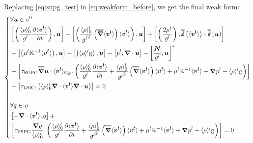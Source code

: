 Replacing \cref{eq:supg_test} in \cref{eq:weakform_before}, we get the final weak form:
\begin{equation}
	\label{eq:weakform_after}
   \left\{
   \begin{aligned}
    &\forall \vec{u} \in \upsilon^0 \\
	&\crochet{ \brac{\frac{\rhol_0}{\gl} \tempup{\vit}},\vec{u}} + 
	 \crochet{ \brac{\frac{\rhol_0}{\gl^2} \brac{\nabmat \vit} \vit},\vec{u}} + 
	 \crochet{\brac{\frac{2\mul}{\gl}}, \strainrate\brac{\vit}:\strainrate\brac{\vec{u}} } \\
	& + \crochet{\brac{\mul \K^{-1} \vit },\vec{u}}
	 - \crochet{\brac{\rhol \gravity},\vec{u}}
	 - \crochet{p^l,\nabvec \cdot \vec{u}}
	 - \crochet{\frac{\vec{N}}{\gl},\vec{u}}^{*} \\
	 & + \crochet{\tausupg \nabmat \vec{u} \cdot \vit_{\Ohm_E} , 
	 \brac{\frac{\rhol_0}{\gl} \tempup{\vit} + \frac{\rhol_0}{\gl^2} \brac{\nabmat \vit} \vit
	   +  \mul \K^{-1} \vit + \nabvec \pl -\rhol \gravity} } \\
	 & + \crochet{\taulsic, \brac{\rhol_0 \nabvec \cdot \vit \nabvec \cdot \vec{u} }} = 0  \\ \\
	 &\forall q \in \varrho \\
	&\crochet{- \nabvec \cdot \vit, q} + \\
	&\crochet{\taupspg \frac{\nabvec q}{\rhol_0}, \brac{\frac{\rhol_0}{\gl} \tempup{\vit} 
	+ \frac{\rhol_0}{\gl^2} \brac{\nabmat \vit} \vit 
	+ \mul \K^{-1} \vit + \nabvec \pl -\rhol \gravity}} = 0
    \end{aligned}
    \right.
\end{equation}
